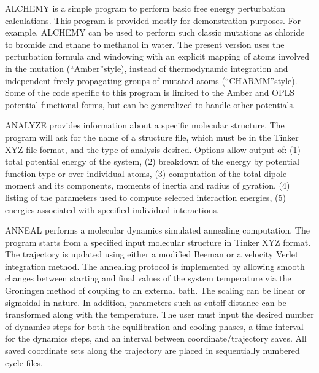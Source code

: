 \documentclass[letterpaper,11pt,english]{sphinxmanual}
\begin{document}
\sphinxAtStartPar
{}

\sphinxAtStartPar
ALCHEMY is a simple program to perform basic free energy perturbation calculations. This program is provided mostly for demonstration purposes. For example, ALCHEMY can be used to perform such classic mutations as chloride to bromide and ethane to methanol in water. The present version uses the perturbation formula and windowing with an explicit mapping of atoms involved in the mutation (“Amber”\sphinxhyphen{}style), instead of thermodynamic integration and independent freely propagating groups of mutated atoms (“CHARMM”\sphinxhyphen{}style). Some of the code specific to this program is limited to the Amber and OPLS potential functional forms, but can be generalized to handle other potentials.

\sphinxAtStartPar
{}

\sphinxAtStartPar
ANALYZE provides information about a specific molecular structure. The program will ask for the name of a structure file, which must be in the Tinker XYZ file format, and the type of analysis desired. Options allow output of:  (1) total potential energy of the system, (2) breakdown of the energy by potential function type or over individual atoms, (3) computation of the total dipole moment and its components, moments of inertia and radius of gyration, (4) listing of the parameters used to compute selected interaction energies, (5) energies associated with specified individual interactions.

\sphinxAtStartPar
{}

\sphinxAtStartPar
ANNEAL performs a molecular dynamics simulated annealing computation. The program starts from a specified input molecular structure in Tinker XYZ format. The trajectory is updated using either a modified Beeman or a velocity Verlet integration method. The annealing protocol is implemented by allowing smooth changes between starting and final values of the system temperature via the Groningen method of coupling to an external bath. The scaling can be linear or sigmoidal in nature. In addition, parameters such as cutoff distance can be transformed along with the temperature. The user must input the desired number of dynamics steps for both the equilibration and cooling phases, a time interval for the dynamics steps, and an interval between coordinate/trajectory saves. All saved coordinate sets along the trajectory are placed in sequentially numbered cycle files.
\end{document}
